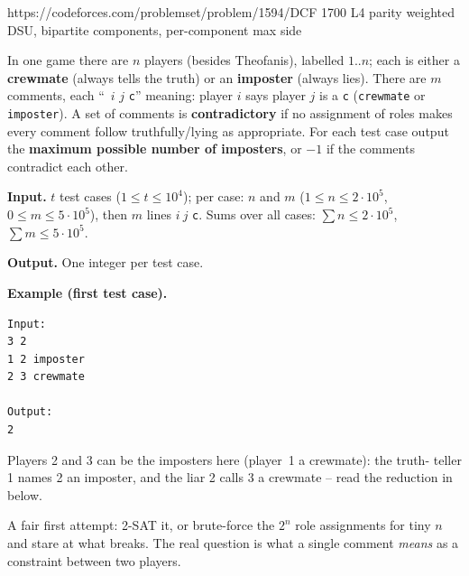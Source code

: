   {https://codeforces.com/problemset/problem/1594/D}{CF 1700 L4}
  {parity weighted DSU, bipartite components, per-component max side}

\begin{problemstatement}
In one game there are \(n\) players (besides Theofanis), labelled
\(1..n\); each is either a \textbf{crewmate} (always tells the truth) or an
\textbf{imposter} (always lies).  There are \(m\) comments, each
``\, \(i\) \(j\) \texttt{c}'' meaning: player \(i\) says player \(j\) is a
\texttt{c} (\texttt{crewmate} or \texttt{imposter}).  A set of comments is
\textbf{contradictory} if no assignment of roles makes every comment follow
truthfully/lying as appropriate.  For each test case output the
\textbf{maximum possible number of imposters}, or \(-1\) if the comments
contradict each other.

\textbf{Input.} \(t\) test cases (\(1\le t\le10^4\)); per case: \(n\) and
\(m\) (\(1\le n\le2\cdot10^5\), \(0\le m\le5\cdot10^5\)), then \(m\) lines
\(i\ j\) \texttt{c}.  Sums over all cases: \(\sum n\le2\cdot10^5\),
\(\sum m\le5\cdot10^5\).

\textbf{Output.} One integer per test case.

\textbf{Example (first test case).}
\begin{verbatim}
Input:
3 2
1 2 imposter
2 3 crewmate

Output:
2
\end{verbatim}
Players 2 and 3 can be the imposters here (player~1 a crewmate): the truth-
teller 1 names 2 an imposter, and the liar 2 calls 3 a crewmate -- read the
reduction in  below.
\end{problemstatement}

\begin{attemptgate}
A fair first attempt: 2-SAT it, or brute-force the \(2^n\) role assignments
for tiny \(n\) and stare at what breaks.  The real question is what a single
comment \emph{means} as a constraint between two players.
\end{attemptgate}

